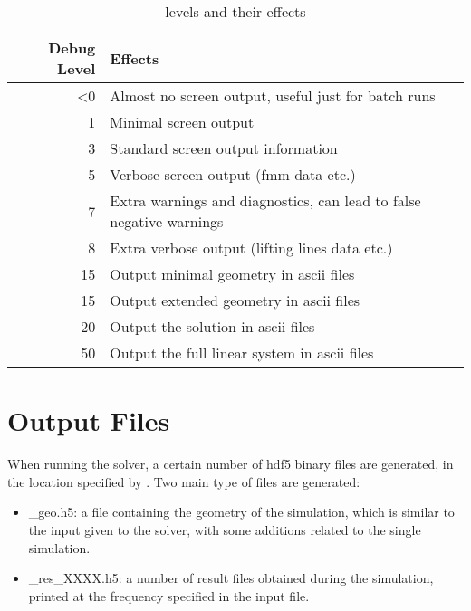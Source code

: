 \begin{table}[]
\centering
\begin{tabular}{@{}rl@{}}
\toprule
Debug Level & Effects \\ \midrule
<0            & Almost no screen output, useful just for batch runs        \\
1             & Minimal screen output        \\
3             & Standard screen output information         \\ 
5             & Verbose screen output (fmm data etc.)\\
7             & Extra warnings and diagnostics, can lead to false negative warnings\\ 
8             & Extra verbose output (lifting lines data etc.)\\\midrule
15            & Output minimal geometry in ascii files \\
15            & Output extended geometry in ascii files \\
20            & Output the solution in ascii files \\
50            & Output the full linear system in ascii files\\
\bottomrule
\end{tabular}
\caption{ levels and their effects}
\label{tab:debug_level}
\end{table}

\section{Output Files}
\label{sec:Solver_Output_Files}

When running the solver, a certain number of hdf5 binary files are generated, in the location specified by . Two main type of files are generated:
\begin{itemize}
    \item {}\_geo.h5: a file containing the geometry of the simulation, which is similar to the input given to the solver, with some additions related to the single simulation.
    \item {}\_res\_XXXX.h5: a number of result files obtained during the simulation, printed at the frequency specified in the input file. 
\end{itemize}
